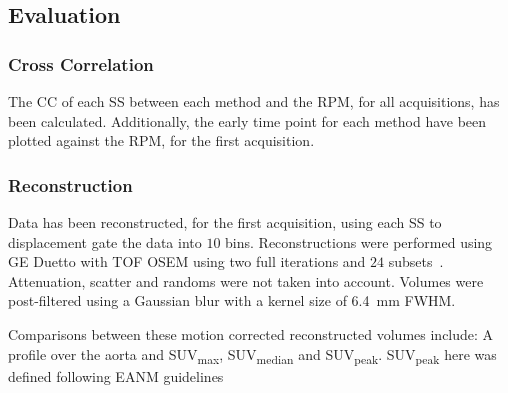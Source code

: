             \subsection{Evaluation} \label{sec:pca_data_driven_surrogate_signal_extraction_methods_for_dynamic_pet_methods_evaluation}
                \subsubsection{Cross Correlation} \label{sec:pca_data_driven_surrogate_signal_extraction_methods_for_dynamic_pet_methods_cross_correlation}
                    The \gls{CC} of each \gls{SS} between each method and the \gls{RPM}, for all acquisitions, has been calculated. Additionally, the early time point  for each method have been plotted against the \gls{RPM}, for the first acquisition.
                
                \subsubsection{Reconstruction} \label{sec:pca_data_driven_surrogate_signal_extraction_methods_for_dynamic_pet_methods_reconstruction}
                    Data has been reconstructed, for the first acquisition, using each \gls{SS} to displacement gate the data into $10$ bins. Reconstructions were performed using \gls{GE} Duetto with \gls{TOF} \gls{OSEM} using two full iterations and $24$ subsets~.
                    Attenuation, scatter and randoms were not taken into account. Volumes were post-filtered using a Gaussian blur with a kernel size of \SI{6.4}{\milli\metre} \gls{FWHM}.
                    
                    Comparisons between these motion corrected reconstructed volumes include: A profile over the aorta and \gls{SUV}\textsubscript{max}, \gls{SUV}\textsubscript{median} and \gls{SUV}\textsubscript{peak}. \gls{SUV}\textsubscript{peak} here was defined following \gls{EANM} guidelines~
            

